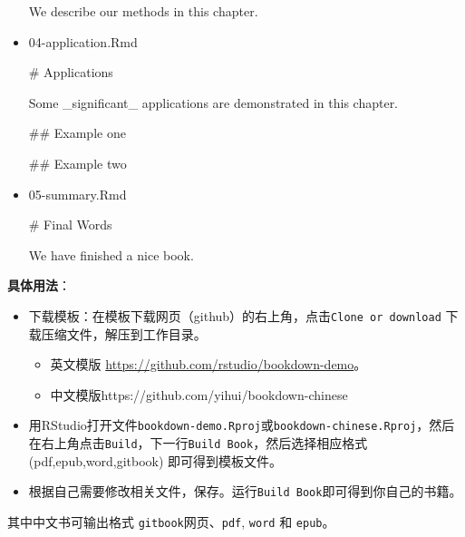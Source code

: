 \documentclass[]{article}
\newenvironment{Shaded}{\begin{snugshade}}{\end{snugshade}}
\newcommand{\FunctionTok}[1]{\textcolor[rgb]{0.00,0.00,0.00}{#1}}
\newcommand{\NormalTok}[1]{#1}
\providecommand{\tightlist}{%
  \setlength{\itemsep}{0pt}\setlength{\parskip}{0pt}}
\begin{document}
\begin{itemize}
\begin{Shaded}
\begin{Highlighting}[]
\NormalTok{We describe our methods in this chapter.}
\end{Highlighting}
\end{Shaded}
\item
  04-application.Rmd

\begin{Shaded}
\begin{Highlighting}[]
\FunctionTok{# Applications}

\NormalTok{Some _significant_ applications are demonstrated}
\NormalTok{in this chapter.}

\FunctionTok{## Example one}

\FunctionTok{## Example two}
\end{Highlighting}
\end{Shaded}
\item
  05-summary.Rmd

\begin{Shaded}
\begin{Highlighting}[]
\FunctionTok{# Final Words}

\NormalTok{We have finished a nice book.}
\end{Highlighting}
\end{Shaded}
\end{itemize}

\textbf{具体用法}：

\begin{itemize}
\tightlist
\item
  下载模板：在模板下载网页（github）的右上角，点击\texttt{Clone\ or\ download}
  下载压缩文件，解压到工作目录。

  \begin{itemize}
  \tightlist
  \item
    英文模版 \url{https://github.com/rstudio/bookdown-demo}。
  \item
    中文模版https://github.com/yihui/bookdown-chinese
  \end{itemize}
\item
  用RStudio打开文件\texttt{bookdown-demo.Rproj}或\texttt{bookdown-chinese.Rproj}，然后在右上角点击\texttt{Build}，下一行\texttt{Build\ Book}，然后选择相应格式
  (pdf,epub,word,gitbook) 即可得到模板文件。
\item
  根据自己需要修改相关文件，保存。运行\texttt{Build\ Book}即可得到你自己的书籍。
\end{itemize}

其中中文书可输出格式 \texttt{gitbook}网页、\texttt{pdf}, \texttt{word}
和 \texttt{epub}。
\end{document}
